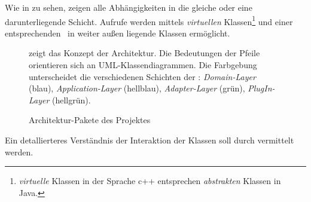 



Wie in  zu sehen, zeigen alle Abhängigkeiten in die gleiche oder eine darunterliegende Schicht. Aufrufe werden mittels \textit{virtuellen} Klassen\footnote{\textit{virtuelle} Klassen in der Sprache c++ entsprechen \textit{abstrakten} Klassen in Java.} und einer entsprechenden \DepInv\ in weiter außen liegende Klassen ermöglicht.


\begin{figure}[ht!]
\vspace{0.25cm}
\begin{center}
\caption{Architektur-Pakete des Projektes}
\label{fig:ArchPkg}
\end{center}

\vspace{0.25cm}
 zeigt das Konzept der Architektur. Die Bedeutungen der Pfeile orientieren sich an UML-Klassendiagrammen. Die Farbgebung unterscheidet die verschiedenen Schichten der \clean: \textit{Domain-Layer} (blau), \textit{Application-Layer} (hellblau), \textit{Adapter-Layer} (grün), \textit{PlugIn-Layer} (hellgrün).
\end{figure}



Ein detallierteres Verständnis der Interaktion der Klassen soll durch  vermittelt werden.

